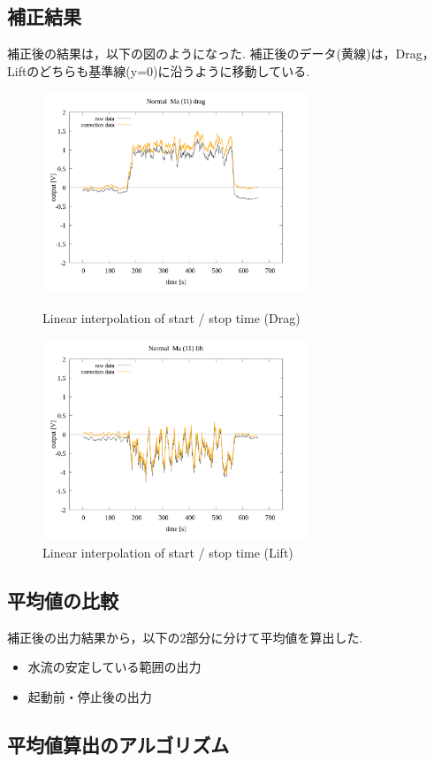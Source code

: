 \documentclass[twocolumn,a4j]{jsarticle}
\begin{document}
\subsection{補正結果}
補正後の結果は，以下の図のようになった.
補正後のデータ(黄線)は，Drag，Liftのどちらも基準線(y=0)に沿うように移動している.
\begin{figure}[htbp]
    \footnotesize
    \begin{center}
        \includegraphics[width=80mm]{images/Normal_ma(11)_drag_04.png}
        \caption{Linear interpolation of start / stop time (Drag)}
        \includegraphics[width=80mm]{images/Normal_ma(11)_lift_04.png}
        \caption{Linear interpolation of start / stop time (Lift)}
    \end{center}
\end{figure}
\newpage
\subsection{平均値の比較}
補正後の出力結果から，以下の2部分に分けて平均値を算出した.
\begin{itemize}
    \item 水流の安定している範囲の出力
    \item 起動前・停止後の出力
\end{itemize}
\subsection{平均値算出のアルゴリズム}
\end{document}
